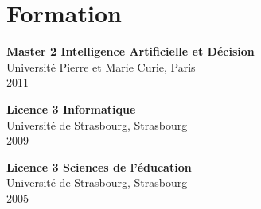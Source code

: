 \section{Formation}

\small
\textbf{Master 2 Intelligence Artificielle et Décision}\\
Université Pierre et Marie Curie, Paris\\
2011

\vspace{4pt}
\textbf{Licence 3 Informatique}\\
Université de Strasbourg, Strasbourg\\
2009

\vspace{4pt}
\textbf{Licence 3 Sciences de l'éducation}\\
Université de Strasbourg, Strasbourg\\
2005
